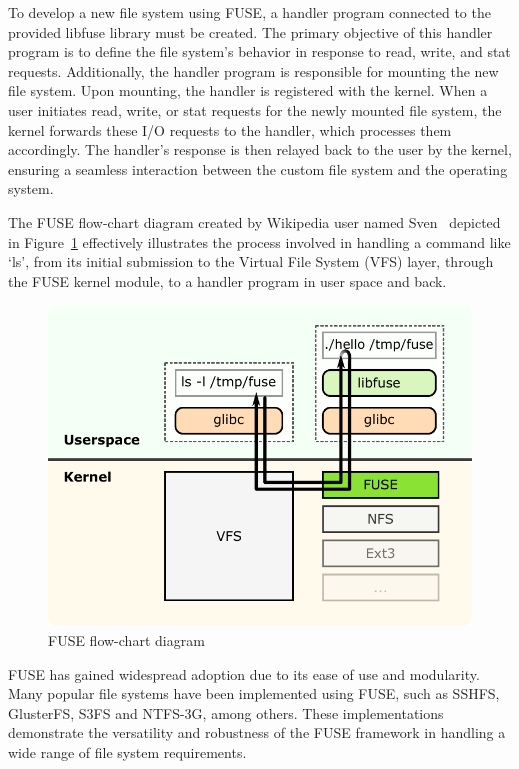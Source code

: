 To develop a new file system using FUSE, a handler program connected to the provided libfuse library must be created.
The primary objective of this handler program is to define the file system's behavior in response to read, write, and stat requests.
Additionally, the handler program is responsible for mounting the new file system.
Upon mounting, the handler is registered with the kernel.
When a user initiates read, write, or stat requests for the newly mounted file system, the kernel forwards these I/O requests to the handler, which processes them accordingly.
The handler's response is then relayed back to the user by the kernel, ensuring a seamless interaction between the custom file system and the operating system.

The FUSE flow-chart diagram created by Wikipedia user named Sven~\cite{fuse-diagram} depicted in Figure~\ref{fig:fuse-diagram} effectively illustrates the process involved in handling a command like `ls', from its initial submission to the Virtual File System (VFS) layer, through the FUSE kernel module, to a handler program in user space and back.

\begin{figure}[ht]
    \centering
    \includegraphics[width=\linewidth]{img/fuse_diagram}
    \caption{FUSE flow-chart diagram}\label{fig:fuse-diagram}
\end{figure}

FUSE has gained widespread adoption due to its ease of use and modularity.
Many popular file systems have been implemented using FUSE, such as SSHFS, GlusterFS, S3FS and NTFS-3G, among others.
These implementations demonstrate the versatility and robustness of the FUSE framework in handling a wide range of file system requirements.


